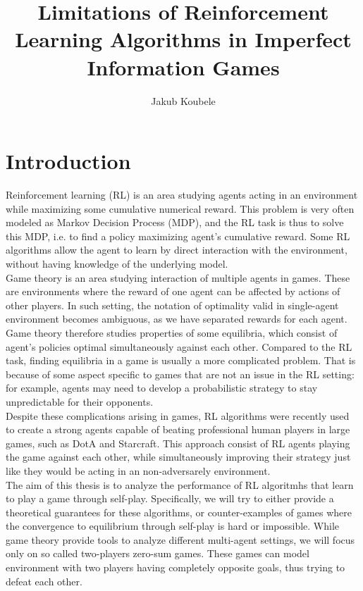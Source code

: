 \documentclass{article}
\title{Limitations of Reinforcement Learning Algorithms in Imperfect Information Games}
\author{Jakub Koubele}
\date{}
\theoremstyle{remark}
\theoremstyle{definition}
\begin{document}
\maketitle
\newpage
\section{Introduction}
Reinforcement learning\cite{rl} (RL) is an area studying agents acting in an environment while maximizing some cumulative numerical reward. This problem is very often modeled as Markov Decision Process (MDP), and the RL task is thus to solve this MDP, i.e. to find a policy maximizing agent's cumulative reward. Some RL algorithms allow the agent to learn by direct interaction with the environment, without having knowledge of the underlying model. \\
Game theory\cite{gt} is an area studying interaction of multiple agents in games. These are environments where the reward of one agent can be affected by actions of other players. In such setting, the notation of optimality valid in single-agent environment becomes ambiguous, as we have separated rewards for each agent. Game theory therefore studies properties of some equilibria, which consist of agent's policies optimal simultaneously against each other. Compared to the RL task, finding equilibria in a game is usually a more complicated problem.  That is because of some aspect specific to games that are not an issue in the RL setting: for example, agents may need to develop a probabilistic strategy to stay unpredictable for their opponents.\\
Despite these complications arising in games, RL algorithms were recently used to create a strong agents capable of beating professional human players in large games, such as DotA and Starcraft. This approach consist of RL agents playing the game against each other, while simultaneously improving their strategy just like they would be acting in an non-adversarely environment. \\
The aim of this thesis is to analyze the performance of RL algoritmhs that learn to play a game through self-play. Specifically, we will try to either provide a 
theoretical guarantees for these algorithms, or counter-examples of games where the convergence to equilibrium through self-play is hard or impossible. 
While game theory provide tools to analyze different multi-agent settings, we will focus only on so called two-players zero-sum games. These games can model environment with two players having completely opposite goals, thus trying to defeat each other.
\newpage
\end{document}
